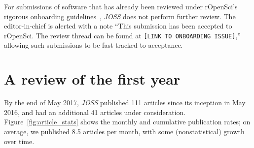 \documentclass{article}
\newcommand\joss{\textit{JOSS}}
\begin{document}
For submissions of software that has already been reviewed under rOpenSci's rigorous
onboarding guidelines~\cite{Ram:2016ws,Ram2017}, \joss{} does not perform
further review. The editor-in-chief is alerted with a note
``This submission has been accepted to rOpenSci. The review thread can be
found at \texttt{[LINK TO ONBOARDING ISSUE]},''  allowing such submissions to be fast-tracked to  acceptance.


\section{A review of the first year}\label{firstyear}

By the end of May 2017, \joss{} published 111 articles since its
inception in May 2016, and had an additional 41 articles under consideration.
Figure~\ref{fig:article_stats} shows the monthly and cumulative publication rates;
on average, we published 8.5 articles per month, with some (nonstatistical) growth over time.

\end{document}
